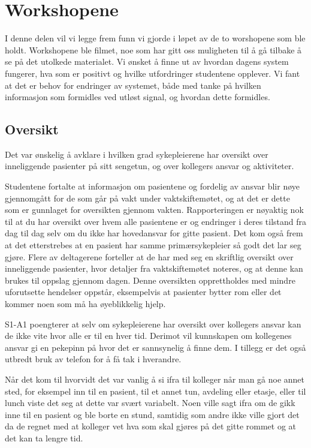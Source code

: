 \section{Workshopene}
\label{ws}

I denne delen vil vi legge frem funn vi gjorde i løpet av de to worshopene som ble holdt. Workshopene ble filmet, noe som har gitt oss muligheten til å gå tilbake å se på det utolkede materialet. Vi ønsket å finne ut av hvordan dagens system fungerer, hva som er positivt og hvilke utfordringer studentene opplever. Vi fant at det er behov for endringer av systemet, både med tanke på hvilken informasjon som formidles ved utløst signal, og hvordan dette formidles.

\subsection{Oversikt}
Det var ønskelig å avklare i hvilken grad sykepleierene har oversikt over inneliggende pasienter på sitt sengetun, og over kollegers ansvar og aktiviteter.

\noindent
Studentene fortalte at informasjon om pasientene og fordelig av ansvar blir nøye gjennomgått for de som går på vakt under vaktskiftemøtet, og at det er dette som er gunnlaget for oversikten gjennom vakten. Rapporteringen er nøyaktig nok til at du har oversikt over hvem alle pasientene er og endringer i deres tilstand fra dag til dag selv om du ikke har hovedansvar for gitte pasient. Det kom også frem at det etterstrebes at en pasient har samme primærsykepleier så godt det lar seg gjøre. Flere av deltagerene forteller at de har med seg en skriftlig oversikt over inneliggende pasienter, hvor detaljer fra vaktskiftemøtet noteres, og at denne kan brukes til oppslag gjennom dagen. Denne oversikten opprettholdes med mindre uforutsette hendelser oppstår, eksempelvis at pasienter bytter rom eller det kommer noen som må ha øyeblikkelig hjelp. 

\noindent
S1-A1 poengterer at selv om sykepleierene har oversikt over kollegers ansvar kan de ikke vite hvor alle er til en hver tid. Derimot vil kunnskapen om kollegenes ansvar gi en pekepinn på hvor det er sannsynelig å finne dem. I tillegg er det også utbredt bruk av telefon for å få tak i hverandre. 

\noindent
Når det kom til hvorvidt det var vanlig å si ifra til kolleger når man gå noe annet sted, for eksempel inn til en pasient, til et annet tun, avdeling eller etasje, eller til lunch viste det seg at dette var svært variabelt. Noen ville sagt ifra om de gikk inne til en pasient og ble borte en stund, samtidig som andre ikke ville gjort det da de regnet med at kolleger vet hva som skal gjøres på det gitte rommet og at det kan ta lengre tid.

